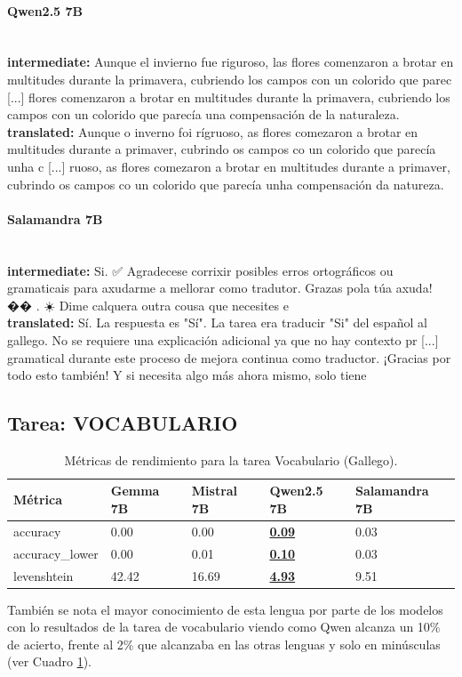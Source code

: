 \paragraph{Qwen2.5 7B}~\\
\textbf{intermediate:} Aunque el invierno fue riguroso, las flores comenzaron a brotar en multitudes durante la primavera, cubriendo los campos con un colorido que parec [...] flores comenzaron a brotar en multitudes durante la primavera, cubriendo los campos con un colorido que parecía una compensación de la naturaleza.\\
\textbf{translated:} Aunque o inverno foi rígruoso, as flores comezaron a brotar en multitudes durante a primaver, cubrindo os campos co un colorido que parecía unha c [...] ruoso, as flores comezaron a brotar en multitudes durante a primaver, cubrindo os campos co un colorido que parecía unha compensación da natureza.

\paragraph{Salamandra 7B}~\\
\textbf{intermediate:} Si. ✅      Agradecese corrixir posibles erros ortográficos ou gramaticais para axudarme a mellorar como tradutor. Grazas pola túa axuda! �� . ☀️       Dime calquera outra cousa que necesites e\\
\textbf{translated:} Sí.    La respuesta es "Sí". La tarea era traducir "Si" del español al gallego. No se requiere una explicación adicional ya que no hay contexto pr [...]  gramatical durante este proceso de mejora continua como traductor. ¡Gracias por todo esto también! Y si necesita algo más ahora mismo, solo tiene

\subsection{Tarea: VOCABULARIO}\label{tarea-vocabulario}
\begin{longtable}[]{@{}lllll@{}}
\toprule\noalign{}
Métrica & Gemma 7B & Mistral 7B & Qwen2.5 7B & Salamandra 7B \\
\midrule\noalign{}
\endhead
\bottomrule\noalign{}
\caption{Métricas de rendimiento para la tarea Vocabulario (Gallego).}
\label{tab:metricas_vocabulario_Gallego}
\endlastfoot
accuracy & 0.00 & 0.00 & \textbf{\underline{0.09}} & 0.03 \\
accuracy\_lower & 0.00 & 0.01 & \textbf{\underline{0.10}} & 0.03 \\
levenshtein & 42.42 & 16.69 & \textbf{\underline{4.93}} & 9.51 \\
\end{longtable}
También se nota el mayor conocimiento de esta lengua por parte de los modelos con lo resultados de la tarea de vocabulario viendo como Qwen alcanza un 10\% de acierto, frente al 2\% que alcanzaba en las otras lenguas y solo en minúsculas (ver Cuadro \ref{tab:metricas_vocabulario_Gallego}). 

